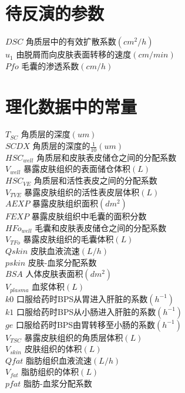 \documentclass[a4paper,punct=banjiao,twoside]{ctexrep}
\theoremstyle{plain}
\theoremstyle{definition}
\theoremstyle{remark}
\begin{document}
\section*{待反演的参数}
\noindent$DSC$ {\hfill  角质层中的有效扩散系数$(cm^2/h)$}\\
$u_1$ {\hfill  由脱屑而向皮肤表面转移的速度$(cm/min)$}\\
$Pfo$ {\hfill  毛囊的渗透系数$(cm/h)$}

\section*{理化数据中的常量}
\noindent$T_{SC}$ {\hfill  角质层的深度$(um)$}\\
$SCDX$ {\hfill  角质层的深度的$\frac{1}{10}(um)$}\\
$HSC_{well}$ {\hfill  角质层和皮肤表皮储仓之间的分配系数}\\
$V_{well}$ {\hfill  暴露皮肤组织的表面储仓体积$(L)$}\\
$HSC_{VE}$ {\hfill  角质层和活性表皮之间的分配系数}\\
$V_{TVE}$ {\hfill  暴露皮肤组织的活性表皮层体积$(L)$}\\
$AEXP $ {\hfill  暴露皮肤组织面积$ (dm^2)$}\\
$ FEXP$ {\hfill  暴露皮肤组织中毛囊的面积分数}\\
$HFo_{well}$ {\hfill  毛囊和皮肤表皮储仓之间的分配系数}\\
$V_{TFo}$ {\hfill  暴露皮肤组织的毛囊体积$(L)$}\\
$ Qskin$ {\hfill  皮肤血液流速$(L/h) $}\\
$ pskin$ {\hfill  皮肤-血浆分配系数}\\
$ BSA$ {\hfill  人体皮肤表面积$(dm^2) $}\\
$V_{plasma}$ {\hfill  血浆体积$(L)$}\\
$k0 $ {\hfill  口服给药时BPS从胃进入肝脏的系数$(h^{-1})$}\\
$k1 $ {\hfill  口服给药时BPS从小肠进入肝脏的系数$(h^{-1})$}\\
$ ge$ {\hfill  口服给药时BPS由胃转移至小肠的系数$(h^{-1})$}\\
$V_{TSC}$ {\hfill  暴露皮肤组织的角质层体积$(L)$}\\
$V_{skin}$ {\hfill  皮肤组织的体积$(L)$}\\
$ Qfat$ {\hfill  脂肪组织血液流速$(L/h) $}\\
$V_{fat}$ {\hfill  脂肪组织的体积$(L)$}\\
$ pfat$ {\hfill  脂肪-血浆分配系数}\\
\end{document}
